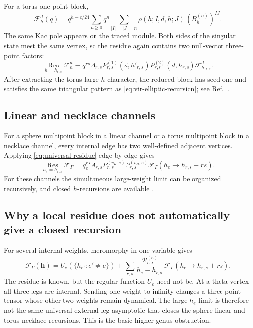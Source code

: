 \documentclass[11pt]{article}
\newcommand{\F}{\mathcal F}
\newcommand{\Res}{\operatorname*{Res}}
\newcommand{\bvec}{\bm}
\begin{document}
For a torus one-point block,
\begin{equation}
 \F_h^{d}(q)
 =
 q^{h-c/24}
 \sum_{n\ge0}q^n
 \sum_{|I|=|J|=n}
 \rho(h;I,d,h;J)\,
 (B_h^{(n)})^{IJ}.
 \label{eq:torus-one-point-definition}
\end{equation}
The same Kac pole appears on the traced module.  Both sides of the singular
state meet the same vertex, so the residue again contains two null-vector
three-point factors:
\begin{equation}
 \Res_{h=h_{r,s}}\F_h^d
 =
 q^{rs}A_{r,s}
 P_{r,s}^{(1)}(d,h'_{r,s})
 P_{r,s}^{(2)}(d,h_{r,s})
 \F_{h'_{r,s}}^d.
 \label{eq:torus-residue}
\end{equation}
After extracting the torus large-\(h\) character, the reduced block has seed
one and satisfies the same triangular pattern as
\eqref{eq:vir-elliptic-recursion}; see
Ref.~\cite{HadaszJaskolskiSuchanek2009Torus}.

\subsection{Linear and necklace channels}

For a sphere multipoint block in a linear channel or a torus multipoint
block in a necklace channel, every internal edge has two well-defined
adjacent vertices.  Applying \eqref{eq:universal-residue} edge by edge gives
\begin{equation}
 \Res_{h_e=h_{r,s}}
 \F_{\Gamma}
 =
 q_e^{rs}A_{r,s}
 P_{r,s}^{(v_L,e)}P_{r,s}^{(v_R,e)}
 \F_{\Gamma}(h_e\to h_{r,s}+rs).
 \label{eq:graph-local-h-residue}
\end{equation}
For these channels the simultaneous large-weight limit can be organized
recursively, and closed \(h\)-recursions are available
\cite{ChoCollierYin2017Recursive}.

\subsection{Why a local residue does not automatically give a closed recursion}

For several internal weights, meromorphy in one variable gives
\begin{equation}
 \F_\Gamma(\bvec h)
 =
 U_e(\{h_{e'}:e'\ne e\})
 +
 \sum_{r,s}
 \frac{\mathcal R_{r,s}^{(e)}}
      {h_e-h_{r,s}}\,
 \F_\Gamma(h_e\to h_{r,s}+rs).
 \label{eq:multivariable-partial-fraction}
\end{equation}
The residue is known, but the regular function \(U_e\) need not be.
At a theta vertex all three legs are internal.  Sending one weight to
infinity changes a three-point tensor whose other two weights remain
dynamical.  The large-\(h_e\) limit is therefore not the same universal
external-leg asymptotic that closes the sphere linear and torus necklace
recursions.  This is the basic higher-genus obstruction.
\end{document}
